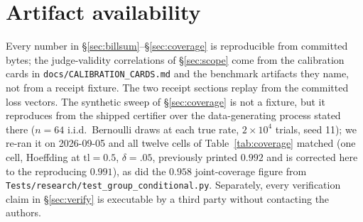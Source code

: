 \documentclass[11pt]{article}
\theoremstyle{definition}
\begin{document}
\section{Artifact availability}\label{sec:artifact}

Every number in \S\ref{sec:billsum}--\S\ref{sec:coverage} is reproducible
from committed bytes; the judge-validity correlations of \S\ref{sec:scope}
come from the calibration cards in \texttt{docs/CALIBRATION\_CARDS.md} and
the benchmark artifacts they name, not from a receipt fixture.
The two receipt sections replay from the committed loss vectors. The synthetic
sweep of \S\ref{sec:coverage} is not a fixture, but it reproduces from the
shipped certifier over the data-generating process stated there ($n=64$ i.i.d.\
Bernoulli draws at each true rate, $2\times 10^{4}$ trials, seed 11); we re-ran
it on 2026-09-05 and all twelve cells of Table~\ref{tab:coverage} matched (one
cell, Hoeffding at $\mathrm{tl}=0.5$, $\delta=.05$, previously printed $0.992$
and is corrected here to the reproducing $0.991$), as
did the $0.958$ joint-coverage figure from
\texttt{Tests/research/test\_group\_conditional.py}. Separately, every
verification claim in \S\ref{sec:verify} is executable by a third party
without contacting the authors.
\end{document}
